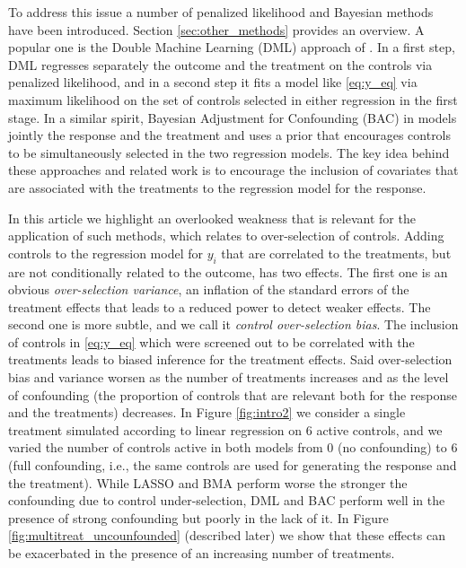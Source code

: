 \documentclass[12pt]{article}
\newcommand{\davidcom}[1]{{\color{red} [DR. #1]} }
\begin{document}

To address this issue a number of penalized likelihood and Bayesian methods have been introduced. Section \ref{sec:other_methods} provides an overview. A popular one is the Double Machine Learning (DML) approach of \cite{Belloni14b}. %
In a first step, DML regresses separately the outcome and the treatment on the controls via penalized likelihood, and in a second step it fits a model like \eqref{eq:y_eq} via maximum likelihood on the set of controls selected in either regression in the first stage.
In a similar spirit, Bayesian Adjustment for Confounding (BAC)  in \cite{Wang12} models jointly the response and the treatment and uses a prior that encourages controls to be simultaneously selected in the two regression models. 
The key idea behind these approaches and related work is to encourage the inclusion of covariates that are associated with the treatments to the regression model for the response. %

In this article we highlight an overlooked weakness that is relevant for the application of such methods, %
which relates to over-selection of controls. Adding controls to the regression model for $y_{i}$ that are correlated to the treatments, but are not conditionally related to the outcome, has two effects. The first one is an obvious \emph{over-selection variance}, an inflation of the standard errors of the treatment effects that leads to a reduced power to detect weaker effects. The second one is more subtle, and we call it \emph{control over-selection bias}. The inclusion of controls in \eqref{eq:y_eq} which were screened out to be correlated with the treatments leads to biased inference for the treatment effects. %
Said over-selection bias and variance worsen as the number of treatments increases and as the level of confounding (the proportion of controls that are relevant both for the response and the treatments) decreases. In Figure \ref{fig:intro2} we consider a single treatment  simulated  according to linear regression on 6 active controls, and we varied the number of controls active in both models from 0 (no confounding) to 6  (full confounding, i.e., the same controls are used for generating the response and the treatment). While LASSO and BMA perform worse the stronger the confounding due to control under-selection, DML and BAC perform well in the presence of strong confounding but poorly in the lack of it. %
In Figure \ref{fig:multitreat_uncounfounded} (described later) we show that these effects can be exacerbated in the presence of an increasing number of treatments.
\end{document}
